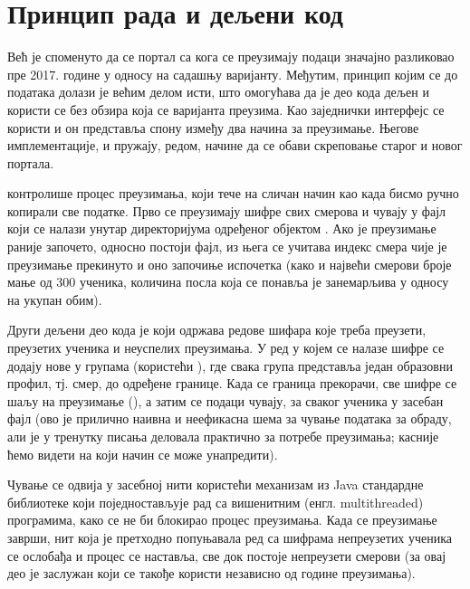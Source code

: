 \section{Принцип рада и дељени код}

Већ је споменуто да се портал са кога се преузимају подаци значајно разликовао пре 2017. године у односу на садашњу варијанту. Међутим, принцип којим се до података долази је већим делом исти, што омогућава да је део кода дељен и користи се без обзира која се варијанта преузима. Као заједнички интерфејс се користи  и он представља спону између два начина за преузимање. Његове имплементације,  и  пружају, редом, начине да се обави скреповање старог и новог портала.

 контролише процес преузимања, који тече на сличан начин као када бисмо ручно копирали све податке. Прво се преузимају шифре свих смерова и чувају у фајл  који се налази унутар директоријума одређеног  објектом . Ако је преузимање раније започето, односно постоји  фајл, из њега се учитава индекс смера чије је преузимање прекинуто и оно започиње испочетка (како и највећи смерови броје мање од 300 ученика, количина посла која се понавља је занемарљива у односу на укупан обим). 

Други дељени део кода је  који одржава редове шифара које треба преузети, преузетих ученика и неуспелих преузимања. У ред у којем се налазе шифре се додају нове у групама (користећи ), где свака група представља један образовни профил, тј. смер, до одређене границе. Када се граница прекорачи, све шифре се шаљу на преузимање (), а затим се подаци чувају, за сваког ученика у засебан фајл (ово је прилично наивна и неефикасна шема за чување података за обраду, али је у тренутку писања деловала практично за потребе преузимања; касније ћемо видети на који начин се може унапредити). 

Чување се одвија у засебној нити користећи  механизам из Java стандардне библиотеке који поједностављује рад са вишенитним (енгл. multithreaded) програмима, како се не би блокирао процес преузимања. Када се преузимање заврши, нит која је претходно попуњавала ред са шифрама непреузетих ученика се ослобађа и процес се наставља, све док постоје непреузети смерови (за овај део је заслужан  који се такође користи независно од године преузимања).



